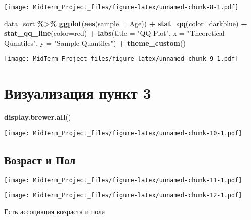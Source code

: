 \documentclass[
]{article}
\newenvironment{Shaded}{\begin{snugshade}}{\end{snugshade}}
\newcommand{\AttributeTok}[1]{\textcolor[rgb]{0.13,0.29,0.53}{#1}}
\newcommand{\FunctionTok}[1]{\textcolor[rgb]{0.13,0.29,0.53}{\textbf{#1}}}
\newcommand{\NormalTok}[1]{#1}
\newcommand{\SpecialCharTok}[1]{\textcolor[rgb]{0.81,0.36,0.00}{\textbf{#1}}}
\newcommand{\StringTok}[1]{\textcolor[rgb]{0.31,0.60,0.02}{#1}}
\begin{document}
\texttt{[image: MidTerm\_Project\_files/figure-latex/unnamed-chunk-8-1.pdf]}

\begin{Shaded}
\begin{Highlighting}[]
\NormalTok{data\_sort }\SpecialCharTok{\%\textgreater{}\%} \FunctionTok{ggplot}\NormalTok{(}\FunctionTok{aes}\NormalTok{(}\AttributeTok{sample =}\NormalTok{ Age)) }\SpecialCharTok{+}
  \FunctionTok{stat\_qq}\NormalTok{(}\AttributeTok{color=}\StringTok{\textquotesingle{}darkblue\textquotesingle{}}\NormalTok{) }\SpecialCharTok{+}
  \FunctionTok{stat\_qq\_line}\NormalTok{(}\AttributeTok{color=}\StringTok{\textquotesingle{}red\textquotesingle{}}\NormalTok{) }\SpecialCharTok{+}
  \FunctionTok{labs}\NormalTok{(}\AttributeTok{title =} \StringTok{"QQ Plot"}\NormalTok{,}
       \AttributeTok{x =} \StringTok{"Theoretical Quantiles"}\NormalTok{,}
       \AttributeTok{y =} \StringTok{"Sample Quantiles"}\NormalTok{) }\SpecialCharTok{+}
  \FunctionTok{theme\_custom}\NormalTok{()}
\end{Highlighting}
\end{Shaded}

\texttt{[image: MidTerm\_Project\_files/figure-latex/unnamed-chunk-9-1.pdf]}

\section{Визуализация пункт
3}\label{ux432ux438ux437ux443ux430ux43bux438ux437ux430ux446ux438ux44f-ux43fux443ux43dux43aux442-3}

\begin{Shaded}
\begin{Highlighting}[]
\FunctionTok{display.brewer.all}\NormalTok{()}
\end{Highlighting}
\end{Shaded}

\texttt{[image: MidTerm\_Project\_files/figure-latex/unnamed-chunk-10-1.pdf]}

\subsection{Возраст и
Пол}\label{ux432ux43eux437ux440ux430ux441ux442-ux438-ux43fux43eux43b}

\texttt{[image: MidTerm\_Project\_files/figure-latex/unnamed-chunk-11-1.pdf]}

\texttt{[image: MidTerm\_Project\_files/figure-latex/unnamed-chunk-12-1.pdf]}

Есть ассоциация возраста и пола
\end{document}
